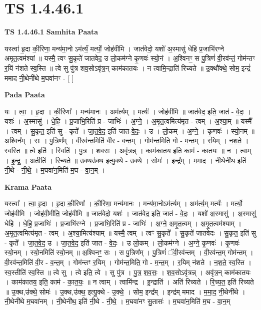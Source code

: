 \documentclass[17pt]{extarticle}
\begin{document}
\section*{ TS 1.4.46.1 }

\textbf{TS 1.4.46.1 } \newline
\textbf{Samhita Paata} \newline

यस्त्वा॑ हृ॒दा की॒रिणा॒ मन्य॑मा॒नो ऽम॑र्त्यं॒ मर्त्यो॒ जोह॑वीमि । जात॑वेदो॒ यशो॑ अ॒स्मासु॑ धेहि प्र॒जाभि॑रग्ने अमृत॒त्वम॑श्यां ॥ यस्मै॒ त्वꣳ सु॒कृते॑ जातवेद॒ उ लो॒कम॑ग्ने कृ॒णवः॑ स्यो॒नं । अ॒श्विनꣳ॒॒ स पु॒त्रिणं॑ वी॒रव॑न्तं॒ गोम॑न्तꣳ र॒यिं न॑शते स्व॒स्ति ॥ त्वे सु पु॑त्र शव॒सोऽवृ॑त्र॒न् काम॑कातयः । न त्वामि॒न्द्राति॑ रिच्यते ॥ उ॒क्थौ॑क्थे॒ सोम॒ इन्द्रं॑ ममाद नी॒थेनी॑थे म॒घवा॑नꣳ - [ ] \newline

\textbf{Pada Paata} \newline

यः । त्वा॒ । हृ॒दा । की॒रिणा᳚ । मन्य॑मानः । अम॑र्त्यम् । मर्त्यः॑ । जोह॑वीमि ॥ जात॑वेद॒ इति॒ जात॑ - वे॒दः॒ । यशः॑ । अ॒स्मासु॑ । धे॒हि॒ । प्र॒जाभि॒रिति॑ प्र - जाभिः॑ । अ॒ग्ने॒ । अ॒मृ॒त॒त्वमित्य॑मृत - त्वम् । अ॒श्या॒म् ॥ यस्मै᳚ । त्वम् । सु॒कृत॒ इति॑ सु - कृते᳚ । जा॒त॒वे॒द॒ इति॑ जात-वे॒दः॒ । उ । लो॒कम् । अ॒ग्ने॒ । कृ॒णवः॑ । स्यो॒नम् ॥ अ॒श्विन᳚म् । सः । पु॒त्रिण᳚म् । वी॒रव॑न्त॒मिति॑ वी॒र - व॒न्त॒म् । गोम॑न्त॒मिति॒ गो - म॒न्त॒म् । र॒यिम् । न॒श॒ते॒ । स्व॒स्ति ॥ त्वे इति॑ । स्विति॑ । पु॒त्र॒ । श॒व॒सः॒ । अवृ॑त्रन्न् । काम॑कातय॒ इति॒ काम॑ - का॒त॒यः॒ ॥ न । त्वाम् । इ॒न्द्र॒ । अतीति॑ । रि॒च्य॒ते॒ ॥ उ॒क्थ‌उ॑क्थ॒ इत्यु॒क्थे - उ॒क्थे॒ । सोमः॑ । इन्द्र᳚म् । म॒मा॒द॒ । नी॒थेनी॑थ॒ इति॑ नी॒थे - नी॒थे॒ । म॒घवा॑न॒मिति॑ म॒घ - वा॒न॒म् ।  \newline


\textbf{Krama Paata} \newline

यस्त्वा᳚ । त्वा॒ हृ॒दा । हृ॒दा की॒रिणा᳚ । की॒रिणा॒ मन्य॑मानः । मन्य॑मा॒नोऽम॑र्त्यम् । अम॑र्त्य॒म् मर्त्यः॑ । मर्त्यो॒ जोह॑वीमि । जोह॑वी॒मीति॒ जोह॑वीमि ॥ जात॑वेदो॒ यशः॑ । जात॑वेद॒ इति॒ जात॑ - वे॒दः॒ । यशो॑ अ॒स्मासु॑ । अ॒स्मासु॑ धेहि । धे॒हि॒ प्र॒जाभिः॑ । प्र॒जाभि॑रग्ने । प्र॒जाभि॒रिति॑ प्र - जाभिः॑ । अ॒ग्ने॒ अ॒मृ॒त॒त्वम् । अ॒मृ॒त॒त्वम॑श्याम् । अ॒मृ॒त॒त्वमित्य॑मृत - त्वम् । अ॒श्या॒मित्य॑श्याम् ॥ यस्मै॒ त्वम् । त्वꣳ सु॒कृते᳚ । सु॒कृते॑ जातवेदः । सु॒कृत॒ इति॑ सु - कृते᳚ । जा॒त॒वे॒द॒ उ । जा॒त॒वे॒द॒ इति॑ जात - वे॒दः॒ । उ लो॒कम् । लो॒कम॑ग्ने । अ॒ग्ने॒ कृ॒णवः॑ । कृ॒णवः॑ स्यो॒नम् । स्यो॒नमिति॑ स्यो॒नम् ॥ अ॒श्विनꣳ॒॒ सः । स पु॒त्रिण᳚म् । पु॒त्रिणं॑ ॅवी॒रव॑न्तम् । वी॒रव॑न्त॒म् गोम॑न्तम् । वी॒रव॑न्त॒मिति॑ वी॒र - व॒न्त॒म् । गोम॑न्तꣳ र॒यिम् । गोम॑न्त॒मिति॒ गो - म॒न्त॒म् । र॒यिम् न॑शते । न॒श॒ते॒ स्व॒स्ति । स्व॒स्तीति॑ स्व॒स्ति ॥ त्वे सु । त्वे इति॒ त्वे । सु पु॑त्र । पु॒त्र॒ श॒व॒सः॒ । श॒व॒सोऽवृ॑त्रन्न् । अवृ॑त्र॒न् काम॑कातयः । काम॑कातय॒ इति॒ काम॑ - का॒त॒यः॒ ॥ न त्वाम् । त्वामि॑न्द्र । इ॒न्द्राति॑ । अति॑ रिच्यते । रि॒च्य॒त॒ इति॑ रिच्यते ॥ उ॒क्थ,उ॑क्थे॒ सोमः॑ । उ॒क्थ,उ॑क्थ॒ इत्यु॒क्थे - उ॒क्थे॒ । सोम॒ इन्द्र᳚म् । इन्द्र॑म् ममाद । म॒मा॒द॒ नी॒थेनी॑थे । नी॒थेनी॑थे म॒घवा॑नम् । नी॒थेनी॑थ॒ इति॑ नी॒थे - नी॒थे॒ । म॒घवा॑नꣳ सु॒तासः॑ । म॒घवा॑न॒मिति॑ म॒घ - वा॒न॒म् \newline
\end{document}
